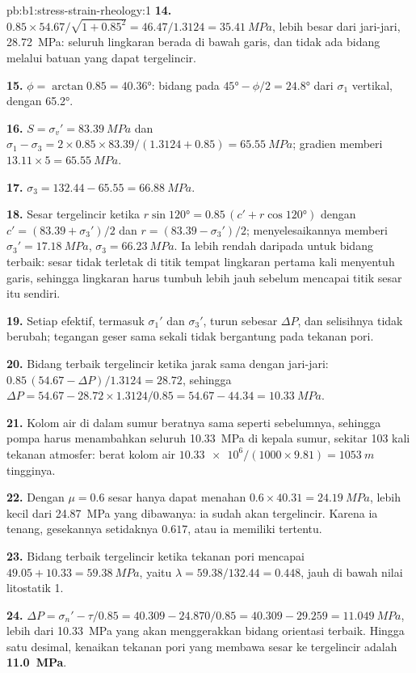 \begin{solution}{pb:b1:stress-strain-rheology:1}
\textbf{14.} $0.85\times54.67/\sqrt{1 + 0.85^2} = 46.47/1.3124 =
\qty{35.41}{MPa}$, lebih besar dari jari-jari, \qty{28.72}{MPa}: seluruh lingkaran
berada di bawah garis, dan tidak ada bidang melalui batuan yang dapat tergelincir.

\textbf{15.} $\phi = \arctan0.85 = \ang{40.36}$: bidang pada
$\ang{45} - \phi/2 = \ang{24.8}$ dari $\sigma_1$ vertikal, dengan 
\ang{65.2}.

\textbf{16.} $S = \sigma_v' = \qty{83.39}{MPa}$ dan
$\sigma_1 - \sigma_3 = 2\times0.85\times83.39/(1.3124 + 0.85) =
\qty{65.55}{MPa}$; gradien memberi $13.11\times5 = \qty{65.55}{MPa}$.

\textbf{17.} $\sigma_3 = 132.44 - 65.55 = \qty{66.88}{MPa}$.

\textbf{18.} Sesar tergelincir ketika
$r\sin\ang{120} = 0.85\,(c' + r\cos\ang{120})$ dengan
$c' = (83.39 + \sigma_3')/2$ dan $r = (83.39 - \sigma_3')/2$; menyelesaikannya memberi
$\sigma_3' = \qty{17.18}{MPa}$, $\sigma_3 = \qty{66.23}{MPa}$. Ia lebih rendah
daripada untuk bidang terbaik: sesar tidak terletak di titik tempat lingkaran
pertama kali menyentuh garis, sehingga lingkaran harus tumbuh lebih jauh sebelum mencapai
titik sesar itu sendiri.

\textbf{19.} Setiap  efektif, termasuk $\sigma_1'$ dan $\sigma_3'$,
turun sebesar $\Delta P$, dan selisihnya tidak berubah; tegangan geser sama sekali tidak
bergantung pada tekanan pori.

\textbf{20.} Bidang terbaik tergelincir ketika jarak sama dengan jari-jari:
$0.85\,(54.67 - \Delta P)/1.3124 = 28.72$, sehingga
$\Delta P = 54.67 - 28.72\times1.3124/0.85 = 54.67 - 44.34 = \qty{10.33}{MPa}$.

\textbf{21.} Kolom air di dalam sumur beratnya sama seperti sebelumnya, sehingga
pompa harus menambahkan seluruh \qty{10.33}{MPa} di kepala sumur, sekitar 103 kali
tekanan atmosfer: berat kolom air
$\num{10.33e6}/(1000\times9.81) = \qty{1053}{m}$ tingginya.

\textbf{22.} Dengan $\mu = 0.6$ sesar hanya dapat menahan
$0.6\times40.31 = \qty{24.19}{MPa}$, lebih kecil dari \qty{24.87}{MPa} yang dibawanya:
ia sudah akan tergelincir. Karena ia tenang, gesekannya setidaknya $0.617$, atau
ia memiliki  tertentu.

\textbf{23.} Bidang terbaik tergelincir ketika tekanan pori mencapai
$49.05 + 10.33 = \qty{59.38}{MPa}$, yaitu $\lambda = 59.38/132.44 = 0.448$,
jauh di bawah nilai litostatik 1.

\textbf{24.} $\Delta P = \sigma_n' - \tau/0.85 = 40.309 - 24.870/0.85 = 40.309 -
29.259 = \qty{11.049}{MPa}$, lebih dari \qty{10.33}{MPa} yang akan menggerakkan
bidang orientasi terbaik. Hingga satu desimal, kenaikan tekanan pori yang membawa sesar
ke tergelincir adalah
\textbf{\qty[text-series-to-math=true]{11.0}{MPa}}.
\end{solution}
